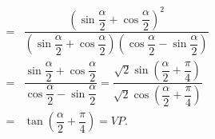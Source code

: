 \begin{bt}
{\begin{enumerate}
\begin{eqnarray*}
				&=& \dfrac{\left( \sin \dfrac{\alpha }{2}+\cos \dfrac{\alpha }{2} \right)^2}{\left( \sin \dfrac{\alpha }{2}+\cos \dfrac{\alpha }{2} \right)\left( \cos \dfrac{\alpha }{2}-\sin \dfrac{\alpha }{2} \right)} \\
				&=& \dfrac{\sin \dfrac{\alpha }{2}+\cos \dfrac{\alpha }{2}}{\cos \dfrac{\alpha }{2}-\sin \dfrac{\alpha }{2}}=\dfrac{\sqrt{2}\sin \left( \dfrac{\alpha }{2}+\dfrac{\pi }{4} \right)}{\sqrt{2}\cos \left( \dfrac{\alpha }{2}+\dfrac{\pi }{4} \right)}\\
				&=& \tan \left( \dfrac{\alpha }{2}+\dfrac{\pi }{4} \right)=VP.
			\end{eqnarray*}
		\end{enumerate}
	}
\end{bt}

\begin{bt}%


\end{bt}
